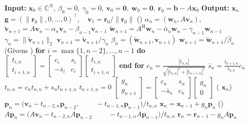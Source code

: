\begin{algorithm}[H]\caption{}\label{alg:qmr}\begin{algorithmic}[1]
\Statex\textbf{Input:} $\bm x_0\in\mathbb C^N,\ \beta_0=0,\ \gamma_0=0,\ \bm v_0=\bm0,\ \bm w_0=\bm0,\ \bm r_0=\bm b-A\bm x_0$
\Statex\textbf{Output:} $\bm x_n$
\State $\bm g=(\|\bm r_0\|,0,\ldots,0)^{\top},\quad\bm v_1=\bm r_0/\|\bm r_0\|$
\State ()
\State $\alpha_n=(\bm w_n,A\bm v_n),$
\State $\widetilde{\bm v}_{n+1}=A\bm v_n-\alpha_n\bm v_n-\beta_{n-1}\bm v_{n-1}$
\State $\widetilde{\bm w}_{n+1}=A^{\mathrm H}\bm w_n-\bar\alpha_n\bm w_n-\gamma_{n-1}\bm w_{n-1}$
\State $\gamma_n=\|\widetilde{\bm v}_{n+1}\|_2$
\State $\bm v_{n+1}=\widetilde{\bm v}_{n+1}/\gamma_n$
\State $\beta_n=(\widetilde{\bm w}_{n+1},\bm v_{n+1})$
\State $\bm w_{n+1}=\widetilde{\bm w}_{n+1}/\bar\beta_n$
\State (Givens )
\State \textbf{for} $i=\max\{1,n-2\},\ldots,n-1$ \textbf{do}
\State $\begin{bmatrix}t_{i,n}\\t_{i+1,n}\end{bmatrix}=\begin{bmatrix}c_i&s_i\\-\bar s_i&c_i\end{bmatrix}\begin{bmatrix}t_{i,n}\\t_{i+1,n}\end{bmatrix}$
\State \textbf{end for}
\State $c_n=\frac{|t_{n,n}|}{\sqrt{|t_{n,n}|^2+|t_{n+1,n}|^2}}$
\State $\bar s_n=\frac{t_{n+1,n}}{t_{n,n}}c_n$
\State $t_{n,n}=c_nt_{n,n}+s_nt_{n+1,n}$
\State $t_{n+1,n}=0$
\State $\begin{bmatrix}g_n\\g_{n+1}\end{bmatrix}=\begin{bmatrix}c_n&s_n\\-\bar s_n&c_n\end{bmatrix}\begin{bmatrix}g_n\\0\end{bmatrix}$
\State ( $\bm x_n$)
\State $\bm p_n=(\bm v_n-t_{n-2,n}\bm p_{n-2},$
\State $\qquad-t_{n-1,n}\bm p_{n-1})/t_{n,n}$
\State $\bm x_n=\bm x_{n-1}+g_n\bm p_n$
\State ()
\State $A\bm p_n=(A\bm v_n-t_{n-2,n}A\bm p_{n-2}$
\State $\qquad-t_{n-1,n}A\bm p_{n-1})/t_{n,n}$
\State $\bm r_n=\bm r_{n-1}-g_nA\bm p_n$
\State {}
\EndFor\end{algorithmic}\end{algorithm}
